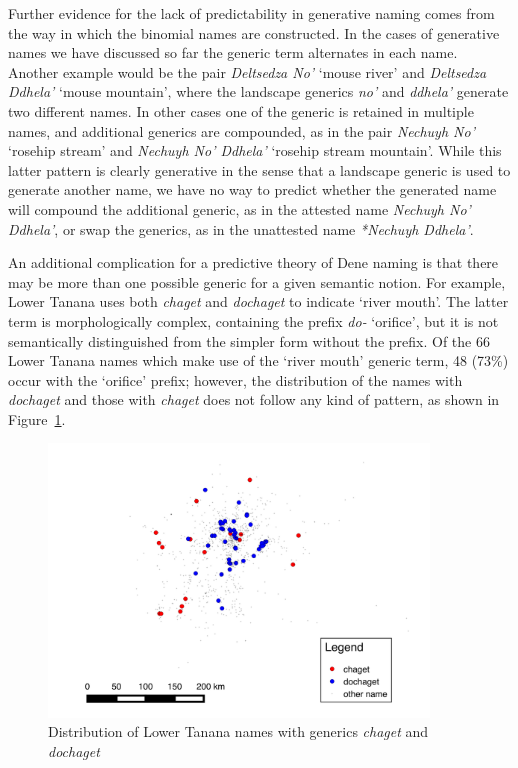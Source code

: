 Further evidence for the lack of predictability in generative naming comes from the way in which the binomial names are constructed. In the cases of generative names we have discussed so far the generic term alternates in each name. Another example would be the pair \textit{Deltsedza No’} ‘mouse river’ and \textit{Deltsedza Ddhela’} `mouse mountain’, where the landscape generics \textit{no’} and \textit{ddhela’} generate two different names. In other cases one of the generic is retained in multiple names, and additional generics are compounded, as in the pair \textit{Nechuyh No’}  ‘rosehip stream’ and \textit{Nechuyh No’ Ddhela’} ‘rosehip stream mountain’. While this latter pattern is clearly generative in the sense that a landscape generic is used to generate another name, we have no way to predict whether the generated name will compound the additional generic, as in the attested name \textit{Nechuyh No’ Ddhela’}, or swap the generics, as in the unattested name \textit{*Nechuyh Ddhela’}. 

An additional complication for a predictive theory of Dene naming is that there may be more than one possible generic for a given semantic notion. For example, Lower Tanana uses both \textit{chaget} and \textit{dochaget} to indicate ‘river mouth’. The latter term is morphologically complex, containing the prefix \textit{do-} ‘orifice’, but it is not semantically distinguished from the simpler form without the prefix. Of the 66 Lower Tanana names which make use of the ‘river mouth’ generic term, 48 (73\%) occur with the ‘orifice’ prefix; however, the distribution of the names with \textit{dochaget} and those with \textit{chaget} does not follow any kind of pattern, as shown in Figure~\ref{holton:fig:1}.

\begin{figure}[ht]
  \includegraphics[width=0.9\textwidth]{figures/holton-fig1}
  \caption{Distribution of Lower Tanana names with generics \textit{chaget} and \textit{dochaget}}
  \label{holton:fig:1}
\end{figure}

